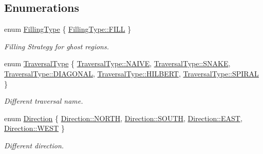 \subsection*{Enumerations}
\begin{DoxyCompactItemize}
\item 
enum \hyperlink{namespacefi_a6808b618c85d179a330ca388162215bd}{Filling\+Type} \{ \hyperlink{namespacefi_a6808b618c85d179a330ca388162215bdae8225b11842409df543692aebed34fd1}{Filling\+Type\+::\+F\+I\+LL}
 \}\begin{DoxyCompactList}\small\item\em Filling Strategy for ghost regions. \end{DoxyCompactList}
\item 
enum \hyperlink{namespacefi_a7ba5ce68668e7f273b22e5f56ca6dfcb}{Traversal\+Type} \{ \newline
\hyperlink{namespacefi_a7ba5ce68668e7f273b22e5f56ca6dfcba33e8270128b994b16da5c9e367bb94cf}{Traversal\+Type\+::\+N\+A\+I\+VE}, 
\hyperlink{namespacefi_a7ba5ce68668e7f273b22e5f56ca6dfcba6a30da74d0b15b45ec14072c93b6645d}{Traversal\+Type\+::\+S\+N\+A\+KE}, 
\hyperlink{namespacefi_a7ba5ce68668e7f273b22e5f56ca6dfcbad3fbf8a4dbb33b1e296fcaa32703b66d}{Traversal\+Type\+::\+D\+I\+A\+G\+O\+N\+AL}, 
\hyperlink{namespacefi_a7ba5ce68668e7f273b22e5f56ca6dfcba778dce36564f152ab7c452d6e5b773e9}{Traversal\+Type\+::\+H\+I\+L\+B\+E\+RT}, 
\newline
\hyperlink{namespacefi_a7ba5ce68668e7f273b22e5f56ca6dfcba550c81f476de2243dc93872a898ea918}{Traversal\+Type\+::\+S\+P\+I\+R\+AL}
 \}\begin{DoxyCompactList}\small\item\em Different traversal name. \end{DoxyCompactList}
\item 
enum \hyperlink{namespacefi_ac2e0fa52c14712db1a6e70da35ae8352}{Direction} \{ \hyperlink{namespacefi_ac2e0fa52c14712db1a6e70da35ae8352a2bf8f791695c70efa9c14e6f1c326403}{Direction\+::\+N\+O\+R\+TH}, 
\hyperlink{namespacefi_ac2e0fa52c14712db1a6e70da35ae8352a96e44fa82e5a5263fb92337be422d3eb}{Direction\+::\+S\+O\+U\+TH}, 
\hyperlink{namespacefi_ac2e0fa52c14712db1a6e70da35ae8352a45ac78bf3d4882ac520f4e7fb08d55c5}{Direction\+::\+E\+A\+ST}, 
\hyperlink{namespacefi_ac2e0fa52c14712db1a6e70da35ae8352a83c9f5692281bf59471b13dfddb3af91}{Direction\+::\+W\+E\+ST}
 \}\begin{DoxyCompactList}\small\item\em Different direction. \end{DoxyCompactList}
\end{DoxyCompactItemize}
